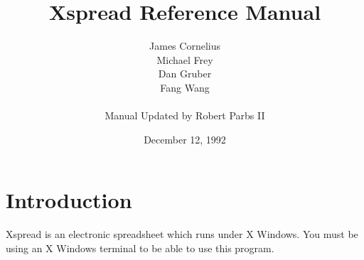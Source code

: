 \topmargin 0in
\headheight 0in
\headsep 0in
\textheight 9in
\textwidth 6.375in
\oddsidemargin 0in
\evensidemargin 0in
\columnsep 0.125in
\columnseprule 0.5pt

\title{\bf Xspread Reference Manual}
\author{James Cornelius\\ Michael Frey\\ Dan Gruber\\ Fang Wang\\
        \\
        Manual Updated by Robert Parbs II}
\date{December 12, 1992}
%

\newcommand{\namelistlabel}[1]{\mbox{#1}\hfil}
\newenvironment{namelist}[1]{%
\begin{list}{}
  {
   \let\makelabel\namelistlabel
   \settowidth{\labelwidth}{#1}
   \setlength{\leftmargin}{1.1\labelwidth}
  }
}{%
\end{list}}

\newcommand{\twiddle}{$\tilde{ }$}  %
\newcommand{\ctrl}{\^{ }}


\maketitle
\newpage

\tableofcontents

\newpage

\section*{Introduction}

    Xspread is an electronic spreadsheet which runs under X Windows.
You must be using an X Windows terminal to be able to use this program.

